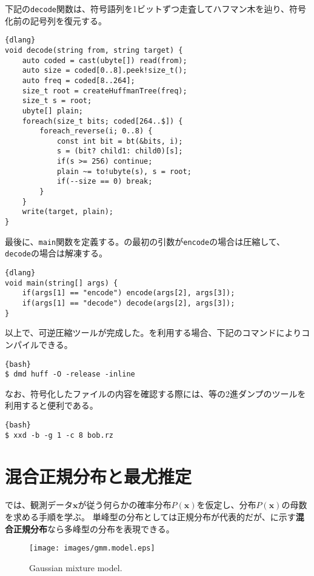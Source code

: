 \documentclass[10pt,a4paper]{book}
\begin{document}
下記の\texttt{decode}関数は、符号語列を1ビットずつ走査してハフマン木を辿り、符号化前の記号列を復元する。

\begin{Verbatim}{dlang}
void decode(string from, string target) {
	auto coded = cast(ubyte[]) read(from);
	auto size = coded[0..8].peek!size_t();
	auto freq = coded[8..264];
	size_t root = createHuffmanTree(freq);
	size_t s = root;
	ubyte[] plain;
	foreach(size_t bits; coded[264..$]) {
		foreach_reverse(i; 0..8) {
			const int bit = bt(&bits, i);
			s = (bit? child1: child0)[s];
			if(s >= 256) continue;
			plain ~= to!ubyte(s), s = root;
			if(--size == 0) break;
		}
	}
	write(target, plain);
}
\end{Verbatim}

最後に、\texttt{main}関数を定義する。\huff{}の最初の引数が\texttt{encode}の場合は圧縮して、\texttt{decode}の場合は解凍する。

\begin{Verbatim}{dlang}
void main(string[] args) {
	if(args[1] == "encode") encode(args[2], args[3]);
	if(args[1] == "decode") decode(args[2], args[3]);
}
\end{Verbatim}

以上で、可逆圧縮ツール\huff{}が完成した。\dmd{}を利用する場合、下記のコマンドによりコンパイルできる。

\begin{Verbatim}{bash}
$ dmd huff -O -release -inline
\end{Verbatim}

なお、符号化したファイルの内容を確認する際には、\xxd{}等の2進ダンプのツールを利用すると便利である。

\begin{Verbatim}{bash}
$ xxd -b -g 1 -c 8 bob.rz
\end{Verbatim}

\chapter{混合正規分布と最尤推定\label{chap:gmm}}

では、観測データ$\bm{x}$が従う何らかの確率分布$P(\bm{x})$を仮定し、分布$P(\bm{x})$の母数を求める手順を学ぶ。
単峰型の分布としては正規分布が代表的だが、に示す\textbf{混合正規分布}なら多峰型の分布を表現できる。

\begin{figure}[h]
\centering
\texttt{[image: images/gmm.model.eps]}
\caption{Gaussian mixture model.\label{fig:gmm.model}}
\end{figure}
\end{document}
